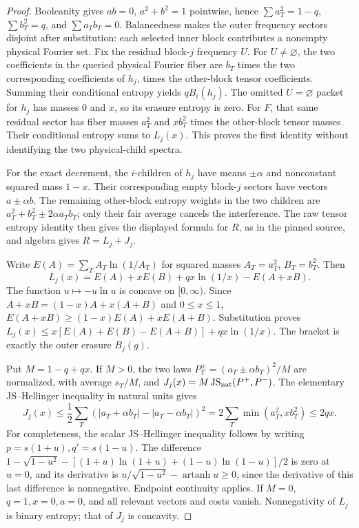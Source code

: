 \documentclass{article}
\begin{document}
\begin{proof}
Booleanity gives $ab=0$, $a^2+b^2=1$ pointwise, hence
$\sum a_T^2=1-q$, $\sum b_T^2=q$, and $\sum a_Tb_T=0$.
Balancedness makes the outer frequency sectors disjoint after substitution:
each selected inner block contributes a nonempty physical Fourier set.
Fix the residual block-$j$ frequency $U$. For $U\ne\varnothing$, the two
coefficients in the queried physical Fourier fiber are $b_T$ times the
two corresponding coefficients of $h_j$, times the other-block tensor
coefficients. Summing their conditional entropy yields $qB_i(h_j)$.
The omitted $U=\varnothing$ packet for $h_j$ has masses $0$ and $x$,
so its erasure entropy is zero. For $F$, that same residual sector has
fiber masses $a_T^2$ and $xb_T^2$ times the other-block tensor masses.
Their conditional entropy sums to $L_j(x)$. This proves the first identity
without identifying the two physical-child spectra.

For the exact decrement, the $i$-children of $h_j$ have means
$\pm\alpha$ and nonconstant squared mass $1-x$. Their corresponding
empty block-$j$ sectors have vectors $a\pm\alpha b$. The remaining
other-block entropy weights in the two children are
$a_T^2+b_T^2\pm2\alpha a_Tb_T$; only their fair average cancels the
interference. The raw tensor entropy identity then gives the displayed
formula for $R$, as in the pinned source, and algebra gives $R=L_j+J_j$.

Write $E(A)=\sum_T A_T\ln(1/A_T)$ for squared masses
$A_T=a_T^2$, $B_T=b_T^2$. Then
\[
 L_j(x)=E(A)+xE(B)+qx\ln(1/x)-E(A+xB).
\]
The function $u\mapsto-u\ln u$ is concave on $[0,\infty)$. Since
$A+xB=(1-x)A+x(A+B)$ and $0\le x\le1$,
$E(A+xB)\ge(1-x)E(A)+xE(A+B)$. Substitution proves
$L_j(x)\le x[E(A)+E(B)-E(A+B)]+qx\ln(1/x)$.
The bracket is exactly the outer erasure $B_j(g)$.

Put $M=1-q+qx$. If $M>0$, the two laws
$P_T^\pm=(a_T\pm\alpha b_T)^2/M$ are normalized, with average
$s_T/M$, and $J_j(x)=M\operatorname{JS}_{\rm nat}(P^+,P^-)$.
The elementary JS--Hellinger inequality in natural units gives
\[
 J_j(x)\le\frac12\sum_T
 (|a_T+\alpha b_T|-|a_T-\alpha b_T|)^2
 =2\sum_T\min(a_T^2,xb_T^2)\le2qx.
\]
For completeness, the scalar JS--Hellinger inequality follows by writing
$p=s(1+u),q'=s(1-u)$. The difference
$1-\sqrt{1-u^2}-[(1+u)\ln(1+u)+(1-u)\ln(1-u)]/2$
is zero at $u=0$, and its derivative is
$u/\sqrt{1-u^2}-\operatorname{artanh}u\ge0$, since the derivative of
this last difference is nonnegative. Endpoint continuity applies.
If $M=0$, $q=1,x=0,a=0$, and all relevant vectors and costs vanish.
Nonnegativity of $L_j$ is binary entropy; that of $J_j$ is concavity.
\end{proof}
\end{document}
